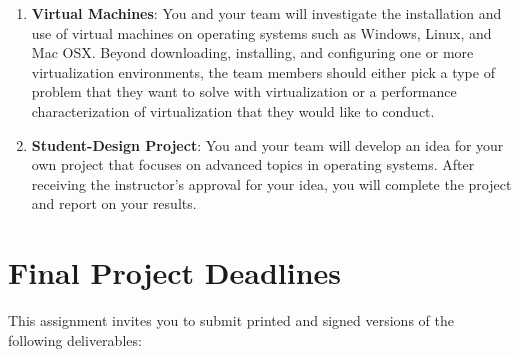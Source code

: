 \begin{enumerate}
  \item {\bf Virtual Machines}: You and your team will investigate the installation and use of virtual machines on
    operating systems such as Windows, Linux, and Mac OSX.  Beyond downloading, installing, and configuring one or more
    virtualization environments, the team members should either pick a type of problem that they want to solve with
    virtualization or a performance characterization of virtualization that they would like to conduct.  

  \item {\bf Student-Design Project}: You and your team will develop an idea for your own project that focuses on
    advanced topics in operating systems. After receiving the instructor's approval for your idea, you will complete the
    project and report on your results.
    
\end{enumerate} 



\section*{Final Project Deadlines}

This assignment invites you to submit printed and signed versions of the following deliverables: 

